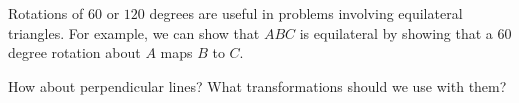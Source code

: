 
Rotations of $60$ or $120$ degrees are useful in problems involving equilateral triangles.  For example, we can show that $ABC$ is equilateral by showing that a $60$ degree rotation about $A$ maps $B$ to $C.$

How about perpendicular lines?  What transformations should we use with them?



















